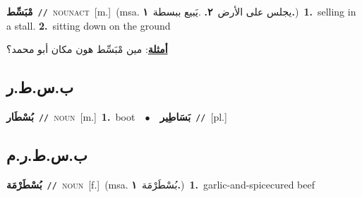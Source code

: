 \documentclass[10pt,a4paper,twoside]{article} %
\begin{document}
\begin{multicols}{2}
{\setlength\topsep{0pt}\textbf{\foreignlanguage{arabic}{مْبَسِّط}}\ {\color{gray}\texttt{//}\color{black}}\ \textsc{noun\textunderscore act}\ [m.]\ \color{gray}(msa. \foreignlanguage{arabic}{يجلس على الأرض}~\foreignlanguage{arabic}{\textbf{٢.}}  .\foreignlanguage{arabic}{يَبيع ببسطة}~\foreignlanguage{arabic}{\textbf{١.}})\color{black}\ \textbf{1.}~selling in a stall.  \textbf{2.}~sitting down on the ground\  \begin{flushright}\color{gray}\foreignlanguage{arabic}{\textbf{\underline{\foreignlanguage{arabic}{أمثلة}}}: مين مْبَسِّط هون مكان أبو محمد؟}\end{flushright}\color{black}} \vspace{2mm}

\vspace{-3mm}
\subsection*{\color{blue}\foreignlanguage{arabic}{ب.س.ط.ر}\color{blue}{ (ntws)}} 

{\setlength\topsep{0pt}\textbf{\foreignlanguage{arabic}{بُسْطَار}}\ {\color{gray}\texttt{//}\color{black}}\ \textsc{noun}\ [m.]\ \textbf{1.}~boot\ \ $\bullet$\ \ \setlength\topsep{0pt}\textbf{\foreignlanguage{arabic}{بَسَاطِير}}\ {\color{gray}\texttt{//}\color{black}}\ [pl.]\ } \vspace{2mm}

\vspace{-3mm}
\subsection*{\color{blue}\foreignlanguage{arabic}{ب.س.ط.ر.م}\color{blue}{ (ntws)}} 

{\setlength\topsep{0pt}\textbf{\foreignlanguage{arabic}{بُسْطَرْمَة}}\ {\color{gray}\texttt{//}\color{black}}\ \textsc{noun}\ [f.]\ \color{gray}(msa. \foreignlanguage{arabic}{بُسْطَرْمَة}~\foreignlanguage{arabic}{\textbf{١.}})\color{black}\ \textbf{1.}~garlic-and-spicecured beef\ } \vspace{2mm}


\end{multicols}
\end{document}

